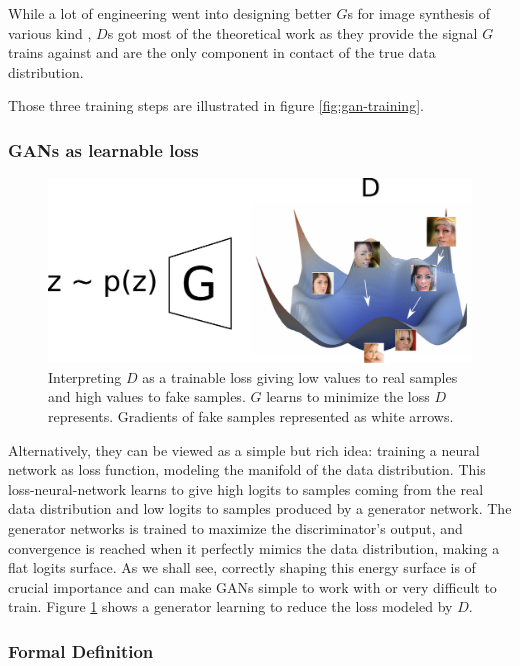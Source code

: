 While a lot of engineering went into designing better $G$s for image synthesis of various kind \cite{progan,stylegan,stylegan2,msggan}, $D$s got most of the theoretical work as they provide the signal $G$ trains against and are the only component in contact of the true data distribution.

Those three training steps are illustrated in figure \ref{fig:gan-training}.

\subsubsection{\acp{GAN} as learnable loss}

\begin{figure}[ht]
    \centering
    \includegraphics[scale=0.5]{60-files/gan-as-loss.pdf}
    \caption{Interpreting $D$ as a trainable loss giving low values to real samples and high values to fake samples. $G$ learns to minimize the loss $D$ represents. Gradients of fake samples represented as white arrows.}
    \label{fig:gan-training-energy}
\end{figure}

Alternatively, they can be viewed as a simple but rich idea: training a neural network as loss function, modeling the manifold of the data distribution. This loss-neural-network learns to give high logits to samples coming from the real data distribution and low logits to samples produced by a generator network. The generator networks is trained to maximize the discriminator's output, and convergence is reached when it perfectly mimics the data distribution, making a flat logits surface. As we shall see, correctly shaping this energy surface is of crucial importance and can make GANs simple to work with or very difficult to train. Figure \ref{fig:gan-training-energy} shows a generator learning to reduce the loss modeled by $D$.

\subsubsection{Formal Definition}


